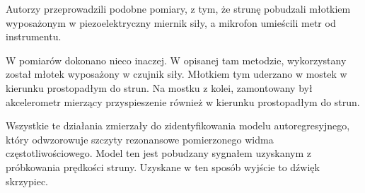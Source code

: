 Autorzy \cite{bowed_4} przeprowadzili podobne pomiary, z tym, że strunę pobudzali młotkiem wyposażonym w piezoelektryczny miernik siły, a mikrofon umieścili metr od instrumentu.

W \cite{bowed_2} pomiarów dokonano nieco inaczej. W opisanej tam metodzie, wykorzystany został młotek wyposażony w czujnik siły. Młotkiem tym uderzano w mostek w kierunku prostopadłym do strun. Na mostku z kolei, zamontowany był akcelerometr mierzący przyspieszenie również w kierunku prostopadłym do strun.

Wszystkie te działania zmierzały do zidentyfikowania modelu autoregresyjnego, który odwzorowuje szczyty rezonansowe pomierzonego widma częstotliwościowego. Model ten jest pobudzany sygnałem uzyskanym z próbkowania prędkości struny. Uzyskane w ten sposób wyjście to dźwięk skrzypiec.
